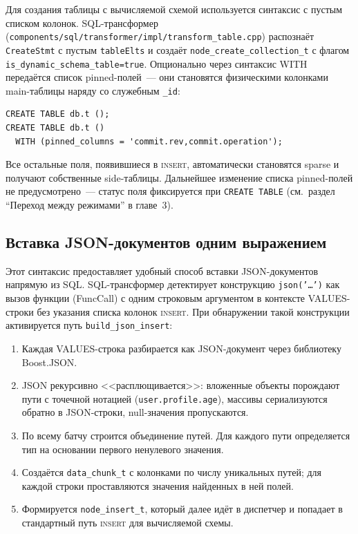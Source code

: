 Для создания таблицы с вычисляемой схемой используется синтаксис с
пустым списком колонок. SQL-трансформер
(\texttt{components/sql/transformer/impl/transform\_table.cpp})
распознаёт \texttt{CreateStmt} с пустым \texttt{tableElts} и создаёт
\texttt{node\_create\_collection\_t} с флагом
\texttt{is\_dynamic\_schema\_table=true}. Опционально через
синтаксис WITH передаётся список pinned-полей~--- они становятся
физическими колонками main-таблицы наряду со служебным
\texttt{\_id}:
\begin{verbatim}
CREATE TABLE db.t ();
CREATE TABLE db.t ()
  WITH (pinned_columns = 'commit.rev,commit.operation');
\end{verbatim}
Все остальные поля, появившиеся в \textsc{insert}, автоматически
становятся sparse и получают собственные side-таблицы. Дальнейшее
изменение списка pinned-полей не предусмотрено~--- статус поля
фиксируется при \texttt{CREATE TABLE} (см.~раздел
``Переход между режимами'' в главе~3).

\subsection{Вставка JSON-документов одним выражением}

Этот синтаксис предоставляет удобный способ вставки JSON-документов
напрямую из SQL. SQL-трансформер детектирует конструкцию
\texttt{json('\ldots')} как вызов функции (FuncCall) с одним
строковым аргументом в контексте VALUES-строки без указания списка
колонок \textsc{insert}. При обнаружении такой конструкции
активируется путь \texttt{build\_json\_insert}:
\begin{enumerate}
    \item Каждая VALUES-строка разбирается как JSON-документ через
    библиотеку Boost.JSON.
    \item JSON рекурсивно <<расплющивается>>: вложенные объекты
    порождают пути с точечной нотацией (\texttt{user.profile.age}),
    массивы сериализуются обратно в JSON-строки, null-значения
    пропускаются.
    \item По всему батчу строится объединение путей. Для каждого
    пути определяется тип на основании первого ненулевого значения.
    \item Создаётся \texttt{data\_chunk\_t} с колонками по числу
    уникальных путей; для каждой строки проставляются значения
    найденных в ней полей.
    \item Формируется \texttt{node\_insert\_t}, который далее идёт
    в диспетчер и попадает в стандартный путь \textsc{insert} для
    вычисляемой схемы.
\end{enumerate}

